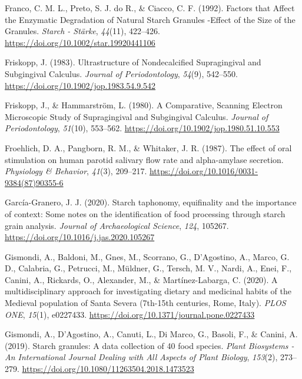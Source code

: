 \documentclass[
  letterpaper,
]{book}
\newlength{\cslhangindent}
\newlength{\cslentryspacingunit} %
\newenvironment{CSLReferences}[2] %
 {%
  \setlength{\parindent}{0pt}
  \ifodd #1
  \let\oldpar\par
  \def\par{\hangindent=\cslhangindent\oldpar}
  \fi
  \setlength{\parskip}{#2\cslentryspacingunit}
 }%
 {}
\begin{document}
\begin{CSLReferences}{1}{0}
\leavevmode{}%
Franco, C. M. L., Preto, S. J. do R., \& Ciacco, C. F. (1992). Factors
that {Affect} the {Enzymatic Degradation} of {Natural Starch Granules}
-{Effect} of the {Size} of the {Granules}. \emph{Starch - Stärke},
\emph{44}(11), 422--426. \url{https://doi.org/10.1002/star.19920441106}

\leavevmode{}%
Friskopp, J. (1983). Ultrastructure of {Nondecalcified Supragingival}
and {Subgingival Calculus}. \emph{Journal of Periodontology},
\emph{54}(9), 542--550. \url{https://doi.org/10.1902/jop.1983.54.9.542}

\leavevmode{}%
Friskopp, J., \& Hammarström, L. (1980). A {Comparative}, {Scanning
Electron Microscopic Study} of {Supragingival} and {Subgingival
Calculus}. \emph{Journal of Periodontology}, \emph{51}(10), 553--562.
\url{https://doi.org/10.1902/jop.1980.51.10.553}

\leavevmode{}%
Froehlich, D. A., Pangborn, R. M., \& Whitaker, J. R. (1987). The effect
of oral stimulation on human parotid salivary flow rate and
alpha-amylase secretion. \emph{Physiology \& Behavior}, \emph{41}(3),
209--217. \url{https://doi.org/10.1016/0031-9384(87)90355-6}

\leavevmode{}%
García-Granero, J. J. (2020). Starch taphonomy, equifinality and the
importance of context: {Some} notes on the identification of food
processing through starch grain analysis. \emph{Journal of
Archaeological Science}, \emph{124}, 105267.
\url{https://doi.org/10.1016/j.jas.2020.105267}

\leavevmode{}%
Gismondi, A., Baldoni, M., Gnes, M., Scorrano, G., D'Agostino, A.,
Marco, G. D., Calabria, G., Petrucci, M., Müldner, G., Tersch, M. V.,
Nardi, A., Enei, F., Canini, A., Rickards, O., Alexander, M., \&
Martínez-Labarga, C. (2020). A multidisciplinary approach for
investigating dietary and medicinal habits of the {Medieval} population
of {Santa Severa} (7th-15th centuries, {Rome}, {Italy}). \emph{PLOS
ONE}, \emph{15}(1), e0227433.
\url{https://doi.org/10.1371/journal.pone.0227433}

\leavevmode{}%
Gismondi, A., D'Agostino, A., Canuti, L., Di Marco, G., Basoli, F., \&
Canini, A. (2019). Starch granules: A data collection of 40 food
species. \emph{Plant Biosystems - An International Journal Dealing with
All Aspects of Plant Biology}, \emph{153}(2), 273--279.
\url{https://doi.org/10.1080/11263504.2018.1473523}


\end{CSLReferences}
\end{document}
